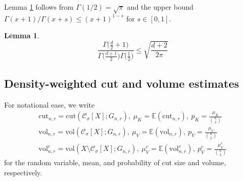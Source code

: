 \documentclass{article}
\newcommand{\vol}{\mathrm{vol}}
\newcommand{\cut}{\mathrm{cut}}
\newcommand{\1}{\mathbf{1}}
\newcommand{\Xbf}{X}             %
\newcommand{\Cset}{\mathcal{C}}
\newcommand{\Csig}{\Cset_{\sigma}}
\theoremstyle{aldenthm}
\newtheorem{lemma}{Lemma}
\theoremstyle{aldenrmrk}
\begin{document}
Lemma \ref{lem: beta_function} follows from $\Gamma(1/2) = \sqrt{\pi}$ and the upper bound $\Gamma(x + 1)/ \Gamma(x+s) \leq (x + 1)^{1-s}$ for $s \in [0,1]$.
\begin{lemma}
	\label{lem: beta_function}
	\begin{equation*}
	\frac{\Gamma\bigl(\frac{d}{2}+ 1\bigr)}{\Gamma\bigl(\frac{d + 1}{2}\bigr) \Gamma\bigl(\frac{1}{2}\bigr)} \leq \sqrt{\frac{d + 2}{2\pi}}
	\end{equation*}
\end{lemma}

\subsection{Density-weighted cut and volume estimates}
\label{sec: density_weighted_cut_and_volume_estimates}

For notational ease, we write
\begin{align*}
\cut_{n,r} = \cut(\Csig[\Xbf]; G_{n,r}), ~ \mu_K = \mathbb{E}(\cut_{n,r}), ~ p_K = \frac{\mu_K}{{n \choose 2}} \\
\vol_{n,r} = \vol(\Csig[\Xbf]; G_{n,r}), ~ \mu_V = \mathbb{E}(\vol_{n,r}), ~ p_V = \frac{\mu_V}{{n \choose 2}} \\
\vol_{n,r}^c = \vol(\Xbf \setminus \Csig[\Xbf]; G_{n,r}), ~ \mu_V^c = \mathbb{E}(\vol_{n,r}^c), ~ p_V^c = \frac{\mu_V^c}{{n \choose 2}}
\end{align*}
for the random variable, mean, and probability of cut size and volume, respectively. 
\end{document}
